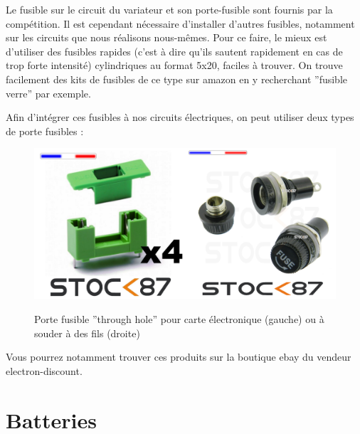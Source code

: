 \documentclass[a4paper, 11pt]{report}
\begin{document}
Le fusible sur le circuit du variateur et son porte-fusible sont fournis
par la compétition. Il est cependant nécessaire d'installer d'autres
fusibles, notamment sur les circuits que nous réalisons nous-mêmes.
Pour ce faire, le mieux est d'utiliser des fusibles rapides (c'est
à dire qu'ils sautent rapidement en cas de trop forte intensité) cylindriques
au format 5x20, faciles à trouver. On trouve facilement des kits de
fusibles de ce type sur amazon en y recherchant ''fusible verre''
par exemple.

Afin d'intégrer ces fusibles à nos circuits électriques, on peut utiliser
deux types de porte fusibles :

\begin{figure}[h]
\caption{Porte fusible ''through hole'' pour carte électronique (gauche)
ou à souder à des fils (droite)}

\centering{}\includegraphics[width=0.5\textwidth]{images/porte_fusible_th.jpg}\includegraphics[width=0.5\textwidth]{images/porte_fusible_fil.png}
\end{figure}

Vous pourrez notamment trouver ces produits sur la boutique ebay du
vendeur electron-discount.

\section{Batteries}
\end{document}
